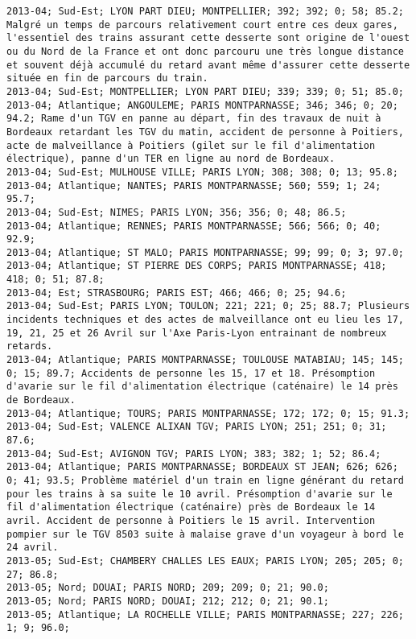 \documentclass{article}
\begin{document}
\begin{Verbatim}[commandchars=\\\{\}]
2013-04; Sud-Est; LYON PART DIEU; MONTPELLIER; 392; 392; 0; 58; 85.2; Malgré un temps de parcours relativement court entre ces deux gares, l'essentiel des trains assurant cette desserte sont origine de l'ouest ou du Nord de la France et ont donc parcouru une très longue distance et souvent déjà accumulé du retard avant même d'assurer cette desserte située en fin de parcours du train.
2013-04; Sud-Est; MONTPELLIER; LYON PART DIEU; 339; 339; 0; 51; 85.0; 
2013-04; Atlantique; ANGOULEME; PARIS MONTPARNASSE; 346; 346; 0; 20; 94.2; Rame d'un TGV en panne au départ, fin des travaux de nuit à Bordeaux retardant les TGV du matin, accident de personne à Poitiers, acte de malveillance à Poitiers (gilet sur le fil d'alimentation électrique), panne d'un TER en ligne au nord de Bordeaux.
2013-04; Sud-Est; MULHOUSE VILLE; PARIS LYON; 308; 308; 0; 13; 95.8; 
2013-04; Atlantique; NANTES; PARIS MONTPARNASSE; 560; 559; 1; 24; 95.7; 
2013-04; Sud-Est; NIMES; PARIS LYON; 356; 356; 0; 48; 86.5; 
2013-04; Atlantique; RENNES; PARIS MONTPARNASSE; 566; 566; 0; 40; 92.9; 
2013-04; Atlantique; ST MALO; PARIS MONTPARNASSE; 99; 99; 0; 3; 97.0; 
2013-04; Atlantique; ST PIERRE DES CORPS; PARIS MONTPARNASSE; 418; 418; 0; 51; 87.8; 
2013-04; Est; STRASBOURG; PARIS EST; 466; 466; 0; 25; 94.6; 
2013-04; Sud-Est; PARIS LYON; TOULON; 221; 221; 0; 25; 88.7; Plusieurs incidents techniques et des actes de malveillance ont eu lieu les 17, 19, 21, 25 et 26 Avril sur l'Axe Paris-Lyon entrainant de nombreux retards.
2013-04; Atlantique; PARIS MONTPARNASSE; TOULOUSE MATABIAU; 145; 145; 0; 15; 89.7; Accidents de personne les 15, 17 et 18. Présomption d'avarie sur le fil d'alimentation électrique (caténaire) le 14 près de Bordeaux.
2013-04; Atlantique; TOURS; PARIS MONTPARNASSE; 172; 172; 0; 15; 91.3; 
2013-04; Sud-Est; VALENCE ALIXAN TGV; PARIS LYON; 251; 251; 0; 31; 87.6; 
2013-04; Sud-Est; AVIGNON TGV; PARIS LYON; 383; 382; 1; 52; 86.4; 
2013-04; Atlantique; PARIS MONTPARNASSE; BORDEAUX ST JEAN; 626; 626; 0; 41; 93.5; Problème matériel d'un train en ligne générant du retard pour les trains à sa suite le 10 avril. Présomption d'avarie sur le fil d'alimentation électrique (caténaire) près de Bordeaux le 14 avril. Accident de personne à Poitiers le 15 avril. Intervention pompier sur le TGV 8503 suite à malaise grave d'un voyageur à bord le 24 avril.
2013-05; Sud-Est; CHAMBERY CHALLES LES EAUX; PARIS LYON; 205; 205; 0; 27; 86.8; 
2013-05; Nord; DOUAI; PARIS NORD; 209; 209; 0; 21; 90.0; 
2013-05; Nord; PARIS NORD; DOUAI; 212; 212; 0; 21; 90.1; 
2013-05; Atlantique; LA ROCHELLE VILLE; PARIS MONTPARNASSE; 227; 226; 1; 9; 96.0; 

\end{Verbatim}
\end{document}
